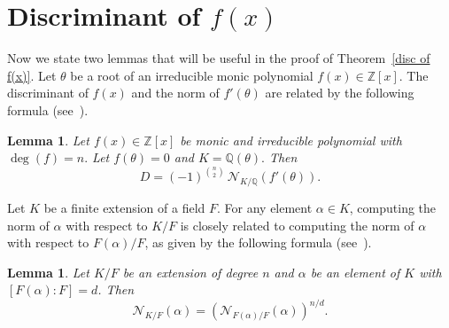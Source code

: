 \documentclass[table]{amsart}
\newtheorem{lemma}[theorem]{Lemma}
\newcommand{\Z}{\mathbb{Z}}
\newcommand{\Q}{\mathbb{Q}}
\numberwithin{equation}{section}
\begin{document}
\section{Discriminant of \texorpdfstring{$f(x)$}{f(x)}}
Now we state two lemmas that will be useful in the proof of Theorem~\ref{disc of f(x)}. 
Let $\theta$ be a root of an irreducible monic polynomial $f(x) \in \mathbb{Z}[x]$. 
The discriminant of $f(x)$ and the norm of $f'(\theta)$ are related by the following formula (see~\cite[Lemma~2.6]{SKM}).

\begin{lemma}\label{2.3} Let $f(x)\in\Z[x]$ be monic and irreducible polynomial with $\deg(f)=n.$ Let $f(\theta)=0$ and $K=\Q(\theta).$ Then
	$$ D=(-1)^{\binom{n}{2}}\,\mathcal{N}_{K/\Q} (f'(\theta)).$$
\end{lemma}
Let $K$ be a finite extension of a field $F$. For any element $\alpha \in K$, computing the norm of $\alpha$ with respect to $K/F$ is closely related to computing the norm of $\alpha$ with respect to $F(\alpha)/F$, as given by the following formula (see~\cite[Theorem~1.20]{SKM}).

\begin{lemma}\label {2.4}Let $K/F$ be an extension of degree $n$ and $\alpha$  be an element of $K$ with $[F(\alpha):F]=d$. Then $$ \mathcal{N}_{K/F}(\alpha)=\left( \mathcal{N}_{F(\alpha)/F}(\alpha)\right)^{n/d}. $$
\end{lemma}
\end{document}
